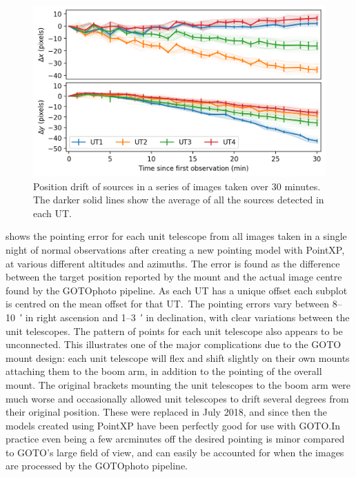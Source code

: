 \begin{colsection}
\begin{figure}[t]
    \begin{center}
        \includegraphics[width=\linewidth]{images/tracking.png}
    \end{center}
    \caption[Position drift over a 30 minute observation]{
        Position drift of sources in a series of images taken over 30 minutes. The darker solid lines show the average of all the sources detected in each UT.\
    }\label{fig:tracking}
\end{figure}

 shows the pointing error for each unit telescope from all images taken in a single night of normal observations after creating a new pointing model with PointXP, at various different altitudes and azimuths. The error is found as the difference between the target position reported by the mount and the actual image centre found by the GOTOphoto pipeline. As each UT has a unique offset each subplot is centred on the mean offset for that UT.\ The pointing errors vary between 8--\SI{10}{\arcmin} in right ascension and 1--\SI{3}{\arcmin} in declination, with clear variations between the unit telescopes. The pattern of points for each unit telescope also appears to be unconnected. This illustrates one of the major complications due to the GOTO mount design: each unit telescope will flex and shift slightly on their own mounts attaching them to the boom arm, in addition to the pointing of the overall mount. The original brackets mounting the unit telescopes to the boom arm were much worse and occasionally allowed unit telescopes to drift several degrees from their original position. These were replaced in July 2018, and since then the models created using PointXP have been perfectly good for use with GOTO.\@ In practice even being a few arcminutes off the desired pointing is minor compared to GOTO's large field of view, and can easily be accounted for when the images are processed by the GOTOphoto pipeline.


\end{colsection}
